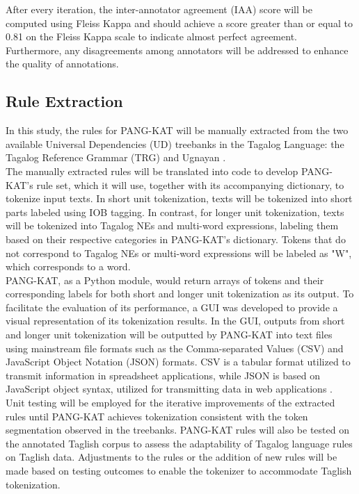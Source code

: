 \documentclass[journal]{./IEEE/IEEEtran}
\begin{document}
After every iteration, the inter-annotator agreement (IAA) score will be computed using Fleiss Kappa {\cite{FleissKappa}} and should achieve a score greater than or equal to 0.81 on the Fleiss Kappa scale to indicate almost perfect agreement. Furthermore, any disagreements among annotators will be addressed to enhance the quality of annotations. \\

\subsection {Rule Extraction}

In this study, the rules for  PANG-KAT will be manually extracted from the two available Universal Dependencies (UD) treebanks in the Tagalog Language: the Tagalog Reference Grammar (TRG) {\cite{TRG}} and Ugnayan {\cite{Ugnayan}}. \\

The manually extracted rules will be translated into code to develop PANG-KAT's rule set, which it will use, together with its accompanying dictionary, to tokenize input texts. In short unit tokenization, texts will be tokenized into short parts labeled using IOB tagging. In contrast, for longer unit tokenization, texts will be tokenized into Tagalog NEs and multi-word expressions,  labeling them based on their respective categories in PANG-KAT's dictionary. Tokens that do not correspond to Tagalog NEs or multi-word expressions will be labeled as "W", which corresponds to a word. \\

PANG-KAT, as a Python module, would return arrays of tokens and their corresponding labels for both short and longer unit tokenization as its output. To facilitate the evaluation of its performance, a GUI was developed to provide a visual representation of its tokenization results. In the GUI, outputs from short and longer unit tokenization will be outputted by PANG-KAT into text files using mainstream file formats such as the Comma-separated Values (CSV) and JavaScript Object Notation (JSON) formats. CSV is a tabular format utilized to transmit information in spreadsheet applications, while JSON is based on JavaScript object syntax, utilized for transmitting data in web applications {\cite{CSV&JSON}}. \\

Unit testing will be employed for the iterative improvements of the extracted rules until PANG-KAT achieves tokenization consistent with the token segmentation observed in the treebanks. PANG-KAT rules will also be tested on the annotated Taglish corpus to assess the adaptability of Tagalog language rules on Taglish data. Adjustments to the rules or the addition of new rules will be made based on testing outcomes to enable the tokenizer to accommodate Taglish tokenization. \\
\end{document}
